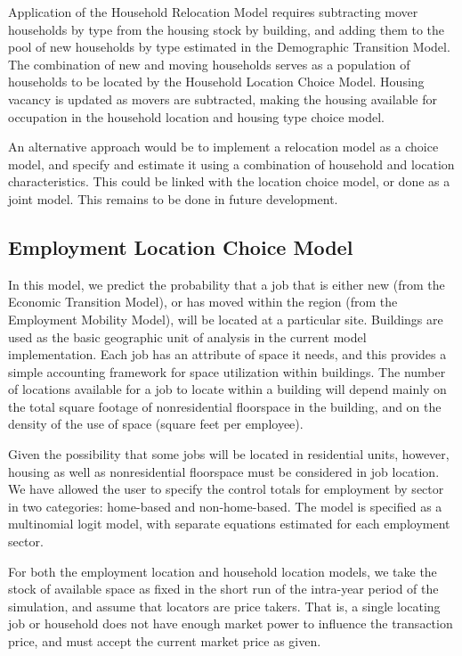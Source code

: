 Application of the Household Relocation Model requires subtracting
mover households by type from the housing stock by building, and
adding them to the pool of new households by type estimated in the
Demographic Transition Model. The combination of new and moving
households serves as a population of households to be located by
the Household Location Choice Model. Housing vacancy is updated as
movers are subtracted, making the housing available for occupation
in the household location and housing type choice model.

An alternative approach would be to implement a relocation model
as a choice model, and specify and estimate it using a combination of household
and location characteristics.  This could be linked with the location choice model,
or done as a joint model.  This remains to be done in future development.


\subsection{Employment Location Choice Model}

In this model, we predict the probability that a job that is
either new (from the Economic Transition Model), or has moved
within the region (from the Employment Mobility Model), will be
located at a particular site.  Buildings are used as the basic
geographic unit of analysis in the current model implementation.
Each job has an attribute of space it needs, and this provides
a simple accounting framework for space utilization within
buildings. The
number of locations available for a job to locate within a building
will depend mainly on the total square footage of
nonresidential floorspace in the building, and on the density of the
use of space (square feet per employee).

Given the possibility
that some jobs will be located in residential units, however,
housing as well as nonresidential floorspace must be considered in
job location.  We have allowed the user to specify the control totals
for employment by sector in two categories: home-based and
non-home-based.  The model is specified as a multinomial logit model,
with separate equations estimated for each employment sector.


For both the employment location and household location models, we
take the stock of available space as fixed in the short run of the
intra-year period of the simulation, and assume that locators are
price takers.  That is, a single locating job or household does
not have enough market power to influence the transaction price,
and must accept the current market price as given.

